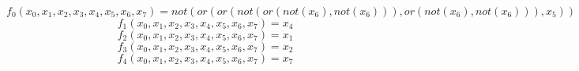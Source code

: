 \documentclass{article}
\begin{document}
\begin{equation}
f_0(x_0,x_1,x_2,x_3,x_4,x_5,x_6,x_7)=not(or(or(not(or(not(x_6), not(x_6))), or(not(x_6), not(x_6))), x_5))
\end{equation}\begin{equation}
f_1(x_0,x_1,x_2,x_3,x_4,x_5,x_6,x_7)=x_4
\end{equation}\begin{equation}
f_2(x_0,x_1,x_2,x_3,x_4,x_5,x_6,x_7)=x_1
\end{equation}\begin{equation}
f_3(x_0,x_1,x_2,x_3,x_4,x_5,x_6,x_7)=x_2
\end{equation}\begin{equation}
f_4(x_0,x_1,x_2,x_3,x_4,x_5,x_6,x_7)=x_7
\end{equation}
\end{document}
